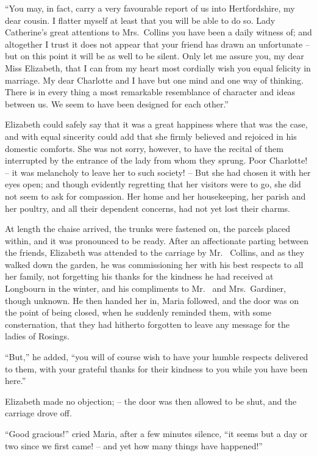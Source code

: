 “You may, in fact, carry a very favourable report of
us into Hertfordshire, my dear cousin. I flatter myself
at least that you will be able to do so. Lady Catherine’s
great attentions to Mrs.\ Collins you have been a daily
witness of; and altogether I trust it does not appear
that your friend has drawn an unfortunate -- but on this
point it will be as well to be silent. Only let me assure
you, my dear Miss Elizabeth, that I can from my heart
most cordially wish you equal felicity in marriage. My
dear Charlotte and I have but one mind and one way of
thinking. There is in every thing a most remarkable
resemblance of character and ideas between us. We seem
to have been designed for each other.”

Elizabeth could safely say that it was a great happiness
where that was the case, and with equal sincerity could
add that she firmly believed and rejoiced in his domestic
comforts. She was not sorry, however, to have the recital
of them interrupted by the entrance of the lady from whom
they sprung. Poor Charlotte! -- it was melancholy to
leave her to such society! -- But she had chosen it with
her eyes open; and though evidently regretting that her
visitors were to go, she did not seem to ask for compassion.
Her home and her housekeeping, her parish and her
poultry, and all their dependent concerns, had not yet
lost their charms.

At length the chaise arrived, the trunks were fastened
on, the parcels placed within, and it was pronounced to
be ready. After an affectionate parting between the
friends, Elizabeth was attended to the carriage by Mr.\ %
Collins, and as they walked down the garden, he was
commissioning her with his best respects to all her family,
not forgetting his thanks for the kindness he had received
at Longbourn in the winter, and his compliments to Mr.\ %
and Mrs.\ Gardiner, though unknown. He then handed
her in, Maria followed, and the door was on the point
of being closed, when he suddenly reminded them, with
some consternation, that they had hitherto forgotten to
leave any message for the ladies of Rosings.

“But,” he added, “you will of course wish to have
your humble respects delivered to them, with your grateful
thanks for their kindness to you while you have been here.”

Elizabeth made no objection; -- the door was then
allowed to be shut, and the carriage drove off.

“Good gracious!” cried Maria, after a few minutes
silence, “it seems but a day or two since we first came! -- and
yet how many things have happened!”

